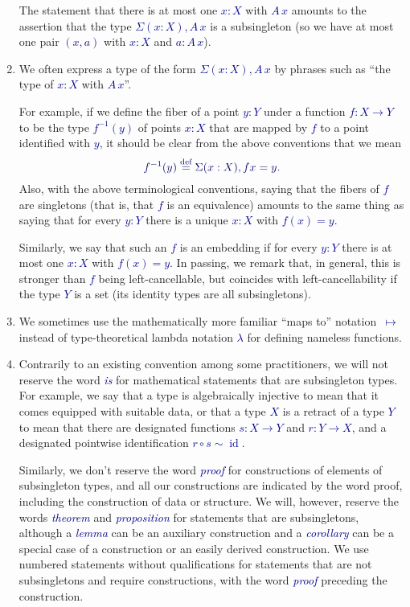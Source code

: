 \documentclass[10pt]{article}
\newcommand{\db}{\textcolor{darkblue}}
\newcommand{\df}[1]{\emph{\db{#1}}}
\newcommand{\m}[1]{\db{$#1$}}
\newcommand{\M}[1]{\[\db{#1}\]}
\newcommand{\id}{\operatorname{id}}
\newcommand{\comp}{\mathrel{\circ}}
\newcommand{\eqdef}{\overset{\text{def}}{=}}
\theoremstyle{definition}
\begin{document}
\begin{enumerate}
  The statement that there is at most one \m{x:X} with \m{A \, x}
  amounts to the assertion that the type \m{\Sigma (x:X), A \, x} is a
  subsingleton (so we have at most one pair \m{(x,a)} with \m{x:X} and
  \m{a : A\, x}).

\item We often express a type of the form \m{\Sigma(x:X), A \, x} by
  phrases such as ``the type of \m{x:X} with \m{A \, x}''.

  For example, if we define the fiber of a point \m{y:Y} under a
  function \m{f : X \to Y} to be the type \m{f^{-1}(y)} of points \m{x:X}
  that are mapped by \m{f} to a point identified with \m{y}, it
  should be clear from the above conventions that we mean
  \M{
   f^{-1}(y) \eqdef \Sigma (x : X), f x = y.
  }
 Also, with the above terminological conventions, saying that the
 fibers of \m{f} are singletons (that is, that \m{f} is an equivalence)
 amounts to the same thing as saying that for every \m{y:Y} there is a
 unique \m{x:X} with \m{f(x)=y}.

 Similarly, we say that such an \m{f} is an embedding if for every
 \m{y:Y} there is at most one \m{x:X} with \m{f(x)=y}. In passing, we
 remark that, in general, this is stronger than \m{f} being
 left-cancellable, but coincides with left-cancellability if the type
 \m{Y} is a set (its identity types are all subsingletons).

\item We sometimes use the mathematically more familiar ``maps to''
  notation~\m{\mapsto} instead of type-theoretical lambda notation
  \m{\lambda} for defining nameless functions.

\item Contrarily to an existing convention among some practitioners,
  we will not reserve the word \df{is} for mathematical statements
  that are subsingleton types. For example, we say that a type is
  algebraically injective to mean that it comes equipped with suitable
  data, or that a type \m{X} is a retract of a type \m{Y} to mean that
  there are designated functions \m{s : X \to Y} and \m{r : Y \to X},
  and a designated pointwise identification \m{r \comp s \sim \id}.

  Similarly, we don't reserve the word \df{proof} for constructions of
  elements of subsingleton types, and all our constructions are
  indicated by the word proof, including the construction of data or
  structure.  We will, however, reserve the words \df{theorem} and
  \df{proposition} for statements that are subsingletons, although a
  \df{lemma} can be an auxiliary construction and a \df{corollary} can
  be a special case of a construction or an easily derived
  construction. We use numbered statements without qualifications for
  statements that are not subsingletons and require constructions,
  with the word \df{proof} preceding the construction.


\end{enumerate}
\end{document}
